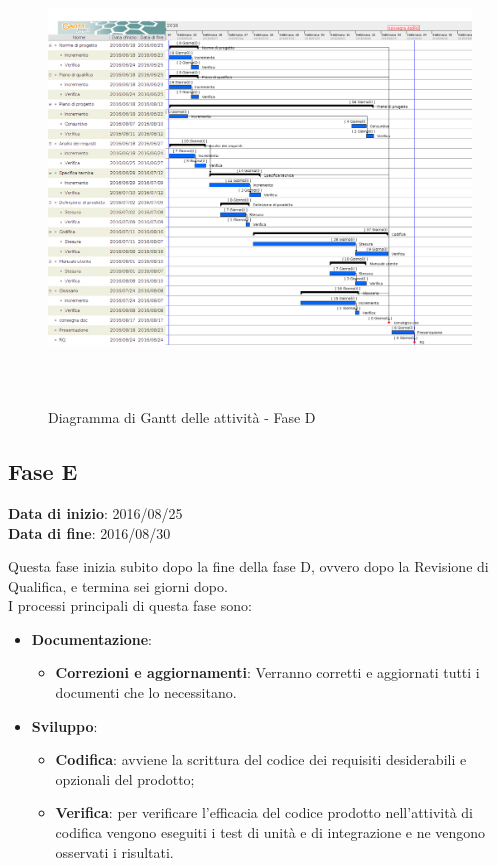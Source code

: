 		\begin{figure}[!h]
			\centering
			\includegraphics[height=12cm, width=15cm]{img/gantt/PDC} 
			\caption{Diagramma di Gantt delle attività - Fase D}
		\end{figure}
		
	\subsection{Fase E}
	\begin{center}
		\textbf{Data di inizio}: 2016/08/25 \\
		\textbf{Data di fine}: 2016/08/30 \\
	\end{center}
	Questa fase inizia subito dopo la fine della fase D, ovvero dopo la Revisione di Qualifica, e termina sei giorni dopo. \\
	I processi principali di questa fase sono: 
		\begin{itemize}
			\item \textbf{Documentazione}:
			\att
			\begin{itemize}
				\item \textbf{Correzioni e aggiornamenti}: Verranno corretti e aggiornati tutti i documenti che lo necessitano. 
			\end{itemize}
			\item \textbf{Sviluppo}:
			\att
			\begin{itemize}
				\item \textbf{Codifica}: avviene la scrittura del codice dei requisiti desiderabili e opzionali del prodotto;
				\item \textbf{Verifica}: per verificare l'efficacia del codice prodotto nell'attività di codifica vengono eseguiti i test di unità e di integrazione e ne vengono osservati i risultati. 
			\end{itemize}
		\end{itemize}
